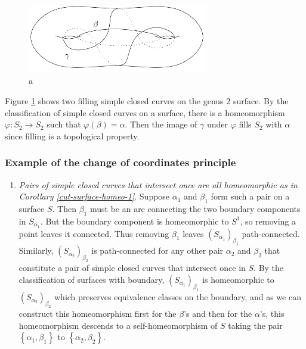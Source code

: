 \documentclass[reqno]{amsart}
\theoremstyle{definition}
\theoremstyle{remark}
\begin{document}
\begin{figure}[htpb]
    \centering
    \includegraphics[width=0.7\textwidth]{filling-genus-2-surface.png}
    \caption{a}
    \label{fig:filling-genus-2-surface-png}
\end{figure}

Figure \ref{fig:filling-genus-2-surface-png} shows
two filling simple closed curves on the genus $2$ surface.
By the classification of simple closed curves on a surface,
there is a homeomorphism $\varphi \colon S_2 \to S_2$ such
that $\varphi\left( \beta \right) =\alpha$. Then
the image of $\gamma$ under $\varphi$ fills $S_2$ with
$\alpha$ since filling is a topological property.

\subsubsection{Example of the change of coordinates principle}

\begin{enumerate}
    \item \textit{Pairs of simple closed curves that intersect
        once are all homeomorphic as in Corollary \ref{cut-surface-homeo-1}}.
        Suppose $\alpha_1$ and $\beta_1$ form
        such a pair on a surface $S$. Then
        $\beta_1$ must be an arc connecting the two
        boundary components in $S_{\alpha_1}$. But the boundary
        component is homeomorphic to $S^{1}$, so removing a 
        point leaves it connected. Thus removing
        $\beta_1$ leaves $\left( S_{\alpha_1} \right)_{\beta_1}$
        path-connected. Similarly,
        $\left( S_{\alpha_2} \right)_{\beta_2}$ is path-connected
        for any other pair $\alpha_2$ and $\beta_2$ that
        constitute a pair of simple closed curves
        that intersect once in $S$. By the classification
        of surfaces with boundary, $\left( S_{\alpha_1} \right)_{\beta_1}$ is
        homeomorphic to $\left( S_{\alpha_2} \right)_{\beta_2}$ 
        which preserves equivalence classes on the boundary,
        and as we can construct this homeomorphism first
        for the $\beta$'s and then for the $\alpha$'s, 
        this homeomorphism descends to a self-homeomorphism
        of $S$ taking the pair $\left\{ \alpha_1, \beta_1 \right\} $ 
        to $\left\{ \alpha_2, \beta_2 \right\} $.
\end{enumerate}
\end{document}
